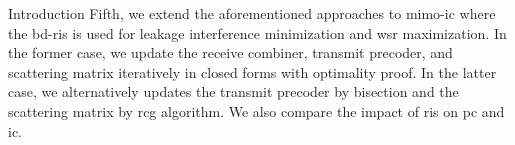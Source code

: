 \begin{section}{Introduction}
	Fifth, we extend the aforementioned approaches to \gls{mimo}-\gls{ic} where the \gls{bd}-\gls{ris} is used for leakage interference minimization and \gls{wsr} maximization.
	In the former case, we update the receive combiner, transmit precoder, and scattering matrix iteratively in closed forms with optimality proof.
	In the latter case, we alternatively updates the transmit precoder by bisection and the scattering matrix by \gls{rcg} algorithm.
	We also compare the impact of \gls{ris} on \gls{pc} and \gls{ic}.





\end{section}


